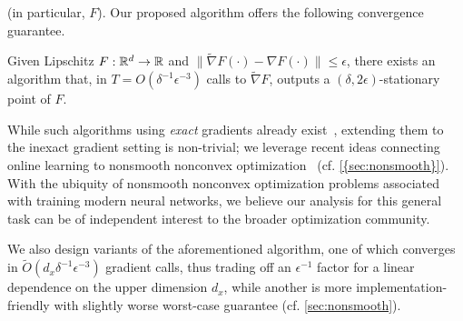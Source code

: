 \begin{description}[style=unboxed,leftmargin=0cm, itemsep=.5em, parsep=.3em, topsep=.5em]
(in particular, $F$). Our proposed algorithm offers the following convergence guarantee.
\begin{theorem}
    Given Lipschitz $F:\mathbb{R}^d\to\mathbb{R}$ 
and $\|\widetilde{\nabla} F(\cdot)-\nabla F(\cdot)\|\leq\epsilon$,
 there exists an algorithm that, in 
$T=O(\delta^{-1}\epsilon^{-3})$
calls to $\widetilde{\nabla}F$,
outputs a $(\delta,2\epsilon)$-stationary point of $F$.
\end{theorem} While such algorithms using  \emph{exact} gradients already exist~\cite{zhang2020complexity, davis2022gradient}, extending them to the inexact gradient  setting is non-trivial; we leverage recent ideas connecting online learning to nonsmooth nonconvex optimization~\cite{cutkosky2023optimal} (cf. \cref{{sec:nonsmooth}}). With the ubiquity of nonsmooth nonconvex  optimization problems associated with
training modern neural networks, we believe our analysis for this general task can be of independent interest to the broader optimization community.  


We also design variants  of the aforementioned algorithm, one of which converges in $\widetilde{O}(d_x \delta^{-1}\epsilon^{-3})$ gradient calls, thus trading off an $\epsilon^{-1}$ factor for a linear dependence on the upper dimension $d_x$, while another is 
more implementation-friendly
with slightly worse worst-case guarantee (cf. \cref{sec:nonsmooth}).


\end{description}
